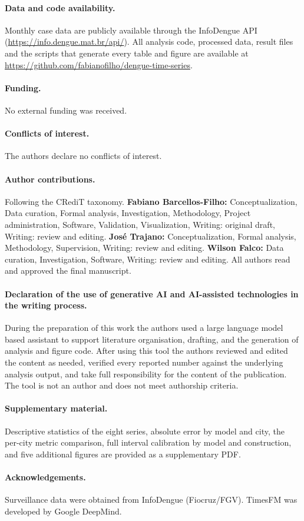 \documentclass[11pt]{article}
\begin{document}
\paragraph{Data and code availability.} Monthly case data are publicly available through
the InfoDengue API (\url{https://info.dengue.mat.br/api/}). All analysis code, processed
data, result files and the scripts that generate every table and figure are available at
\url{https://github.com/fabianofilho/dengue-time-series}.

\paragraph{Funding.} No external funding was received.

\paragraph{Conflicts of interest.} The authors declare no conflicts of interest.

\paragraph{Author contributions.} Following the CRediT taxonomy.
\textbf{Fabiano Barcellos-Filho:} Conceptualization, Data curation, Formal analysis,
Investigation, Methodology, Project administration, Software, Validation, Visualization,
Writing: original draft, Writing: review and editing.
\textbf{Jos\'e Trajano:} Conceptualization, Formal analysis, Methodology, Supervision,
Writing: review and editing.
\textbf{Wilson Falco:} Data curation, Investigation, Software,
Writing: review and editing.
All authors read and approved the final manuscript.

\paragraph{Declaration of the use of generative AI and AI-assisted technologies in the
writing process.} During the preparation of this work the authors used a large language
model based assistant to support literature organisation, drafting, and the generation of
analysis and figure code. After using this tool the authors reviewed and edited the
content as needed, verified every reported number against the underlying analysis output,
and take full responsibility for the content of the publication. The tool is not an author
and does not meet authorship criteria.

\paragraph{Supplementary material.} Descriptive statistics of the eight series, absolute
error by model and city, the per-city metric comparison, full interval calibration by
model and construction, and five additional figures are provided as a supplementary PDF.

\paragraph{Acknowledgements.} Surveillance data were obtained from InfoDengue
(Fiocruz/FGV). TimesFM was developed by Google DeepMind.



\end{document}
